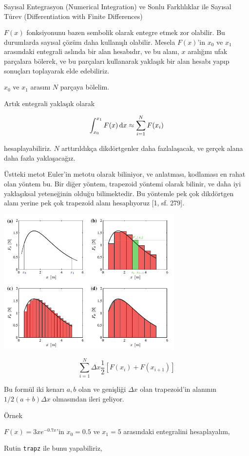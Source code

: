 \documentclass[12pt,fleqn]{article}\usepackage{../../common}
\begin{document}
Sayısal Entegrasyon (Numerical Integration) ve Sonlu Farklılıklar ile Sayısal Türev (Differentiation with Finite Differences)

$F(x)$ fonksiyonunu bazen sembolik olarak entegre etmek zor olabilir. Bu
durumlarda sayısal çözüm daha kullanışlı olabilir. Mesela $F(x)$'in $x_0$
ve $x_1$ arasındaki entegrali aslında bir alan hesabıdır, ve bu alanı, $x$
aralığını ufak parçalara bölerek, ve bu parçaları kullanarak yaklaşık bir
alan hesabı yapıp sonuçları toplayarak elde edebiliriz. 

$x_0$ ve $x_1$ arasını $N$ parçaya bölelim. 

Artık entegrali yaklaşık olarak 

$$
\int_{x_0}^{x_1} F(x) \,\mathrm{d} x \approx \sum_{i=1}^{N} F(x_i)
$$

hesaplayabiliriz. $N$ arttırıldıkça dikdörtgenler daha fazlalaşacak, ve
gerçek alana daha fazla yaklaşacağız. 

Üstteki metot Euler'in metotu olarak biliniyor, ve anlatması, kodlaması en
rahat olan yöntem bu. Bir diğer yöntem, trapezoid yöntemi olarak bilinir,
ve daha iyi yaklaşıksal yeteneğinin olduğu bilimektedir. Bu yöntemle pek
çok dikdörtgen alanı yerine pek çok trapezoid alanı hesaplıyoruz [1,
sf. 279].

\includegraphics[width=25em]{compscieng_app01numint_01.png}

$$
\sum _{i=1}^{N} \Delta x \frac{1}{2} [F(x_i) + F(x_{i+1})]
$$

Bu formül iki kenarı $a,b$ olan ve genişliği $\Delta x$ olan trapezoid'in
alanının $1/2(a+b)\Delta x$ olmasından ileri geliyor.

Örnek

$F(x) = 3 x e^{-0.7 x}$'in $x_0=0.5$ ve $x_1=5$ arasındaki entegralini
hesaplayalım,

Rutin \verb!trapz! ile bunu yapabiliriz,
\end{document}

